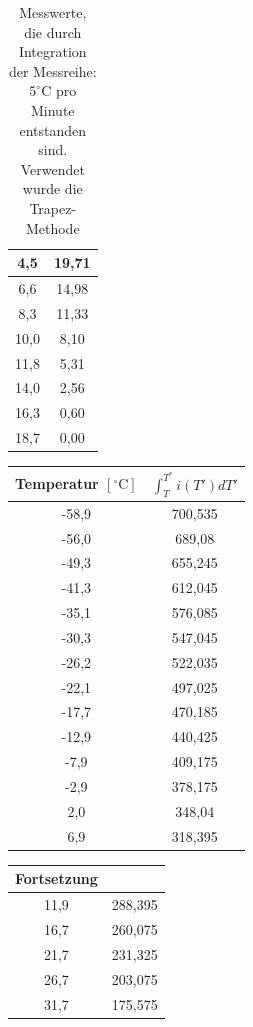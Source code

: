 \begin{table}[htbp]
\begin{minipage}[t]{0.45\textwidth}
\begin{tabular}{c|c}
4,5 &19,71\\\hline
6,6 &14,98\\\hline
8,3 &11,33\\\hline
10,0 &8,10\\\hline
11,8 &5,31\\\hline
14,0 &2,56\\\hline
16,3 &0,60\\\hline
18,7 &0,00\\\hline
\end{tabular}
\end{minipage}
\caption{Messwerte, die durch Integration der Messreihe: $5^\circ$C pro Minute entstanden sind. Verwendet wurde die Trapez-Methode }
\label{tab_int1}
\end{table}

\begin{table}[htbp]
\begin{minipage}[t]{0.45\textwidth}
\centering
\begin{tabular}{c|c}
Temperatur $[^\circ\text{C}]$ & $\int ^{T^*}_{T} i(T')dT'$\\\hline
-58,9 &700,535\\\hline
-56,0 &689,08\\\hline
-49,3 &655,245\\\hline
-41,3 &612,045\\\hline
-35,1 &576,085\\\hline
-30,3 &547,045\\\hline
-26,2 &522,035\\\hline
-22,1 &497,025\\\hline
-17,7 &470,185\\\hline
-12,9 &440,425\\\hline
-7,9 &409,175\\\hline
-2,9 &378,175\\\hline
2,0 &348,04\\\hline
6,9 &318,395\\
\end{tabular}
\end{minipage}
\begin{minipage}[t]{0.45\textwidth}
\centering
\begin{tabular}{c|c}
Fortsetzung & \\\hline
11,9 &288,395\\\hline
16,7 &260,075\\\hline
21,7 &231,325\\\hline
26,7 &203,075\\\hline
31,7 &175,575\\\hline

\end{tabular}
\end{minipage}
\end{table}
